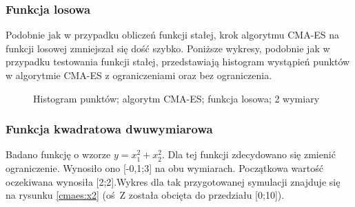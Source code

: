 \documentclass{mini}
\begin{document}
\subsubsection*{Funkcja losowa}
Podobnie jak w przypadku obliczeń funkcji stałej, krok algorytmu CMA-ES na funkcji losowej zmniejszał się dość szybko. Poniższe wykresy, podobnie jak w przypadku testowania funkcji stałej, przedstawiają histogram wystąpień punktów w algorytmie CMA-ES z ograniczeniami oraz bez ograniczenia.

\begin{figure}[H]
\centering
{}
\quad
{}
\caption{Histogram punktów; algorytm CMA-ES; funkcja losowa; 2 wymiary}
\end{figure}

\subsubsection*{Funkcja kwadratowa dwuwymiarowa}
Badano funkcję o wzorze $y=x_1^2+x_2^2$. Dla tej funkcji zdecydowano się zmienić ograniczenie. Wynosiło ono [-0,1;3] na obu wymiarach. Początkowa wartość oczekiwana wynosiła [2;2].Wykres dla tak przygotowanej symulacji znajduje się na rysunku \ref{cmaes:x2} (oś~Z została obcięta do przedziału [0;10]).
\end{document}
